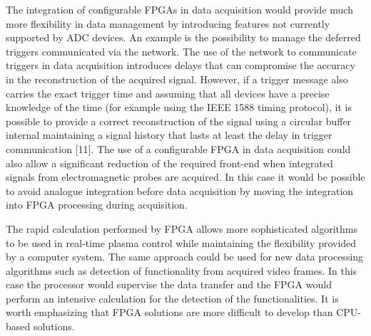 The integration of configurable FPGAs in data acquisition would provide much more flexibility in data management by introducing features not currently supported by ADC devices. An example is the possibility to manage the deferred triggers communicated via the network. The use of the network to communicate triggers in data acquisition introduces delays that can compromise the accuracy in the reconstruction of the acquired signal. However, if a trigger message also carries the exact trigger time and assuming that all devices have a precise knowledge of the time (for example using the IEEE 1588 timing protocol), it is possible to provide a correct reconstruction of the signal using a circular buffer internal maintaining a signal history that lasts at least the delay in trigger communication [11]. The use of a configurable FPGA in data acquisition could also allow a significant reduction of the required front-end when integrated signals from electromagnetic probes are acquired. In this case it would be possible to avoid analogue integration before data acquisition by moving the integration into FPGA processing during acquisition.

The rapid calculation performed by FPGA allows more sophisticated algorithms to be used in real-time plasma control while maintaining the flexibility provided by a computer system. The same approach could be used for new data processing algorithms such as detection of functionality from acquired video frames. In this case the processor would supervise the data transfer and the FPGA would perform an intensive calculation for the detection of the functionalities. It is worth emphasizing that FPGA solutions are more difficult to develop than CPU-based solutions.

